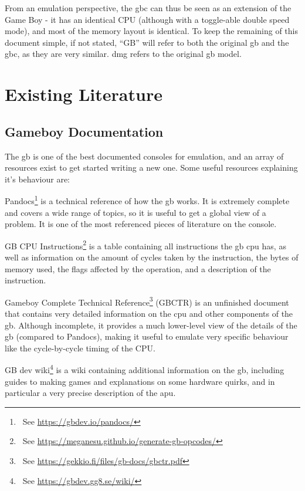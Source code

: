 \documentclass[11pt]{informatics-report}
\newcommand{\ftnt}[1]{\footnote{~See \url{#1}}}
\begin{document}
From an emulation perspective, the \glsdesc{gbc} can thus be seen as an extension of the Game Boy - it has an identical CPU (although with a toggle-able double speed mode), and most of the memory layout is identical. To keep the remaining of this document simple, if not stated, ``GB'' will refer to both the original \glsdesc{gb} and the \glsdesc{gbc}, as they are very similar. \gls{dmg} refers to the original \glsdesc{gb} model.

\section{Existing Literature}

\subsection{Gameboy Documentation}

The \glsdesc{gb} is one of the best documented consoles for emulation, and an array of resources exist to get started writing a new one. Some useful resources explaining it's behaviour are:

\begin{compactitem}
    \item Pandocs\ftnt{https://gbdev.io/pandocs/} is a technical reference of how the \gls{gb} works. It is extremely complete and covers a wide range of topics, so it is useful to get a global view of a problem. It is one of the most referenced pieces of literature on the console.
    \item GB CPU Instructions\ftnt{https://meganesu.github.io/generate-gb-opcodes/} is a table containing all instructions the \gls{gb} \gls{cpu} has, as well as information on the amount of cycles taken by the instruction, the bytes of memory used, the flags affected by the operation, and a description of the instruction.
    \item Gameboy Complete Technical Reference\ftnt{https://gekkio.fi/files/gb-docs/gbctr.pdf} (GBCTR) is an unfinished document that contains very detailed information on the \gls{cpu} and other components of the \gls{gb}. Although incomplete, it provides a much lower-level view of the details of the \gls{gb} (compared to Pandocs), making it useful to emulate very specific behaviour like the cycle-by-cycle timing of the CPU.
    \item GB dev wiki\ftnt{https://gbdev.gg8.se/wiki/} is a wiki containing additional information on the \gls{gb}, including guides to making games and explanations on some hardware quirks, and in particular a very precise description of the \gls{apu}.
\end{compactitem}
\end{document}
